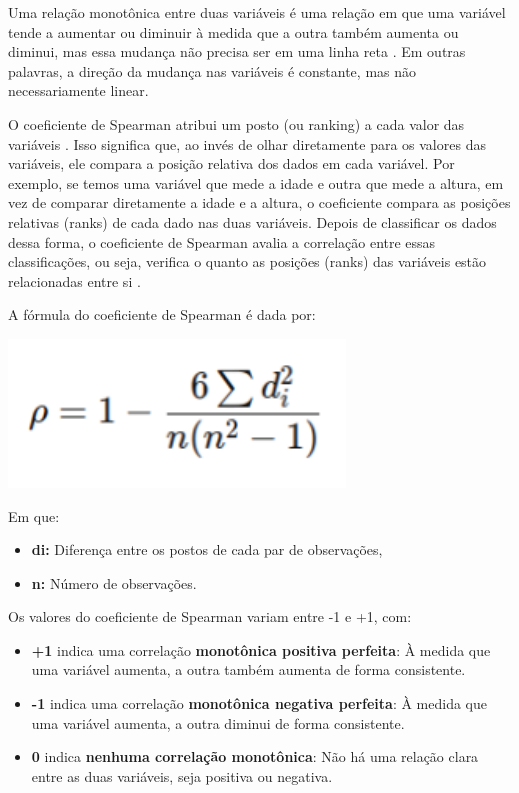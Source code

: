 \begin{apendicesenv}
Uma relação monotônica entre duas variáveis é uma relação em que uma variável tende a aumentar ou diminuir à medida que a outra também aumenta ou diminui, mas essa mudança não precisa ser em uma linha reta \cite{restrepo2007}. Em outras palavras, a direção da mudança nas variáveis é constante, mas não necessariamente linear.

O coeficiente de Spearman atribui um posto (ou ranking) a cada valor das variáveis \cite{sousa2019}. Isso significa que, ao invés de olhar diretamente para os valores das variáveis, ele compara a posição relativa dos dados em cada variável. Por exemplo, se temos uma variável que mede a idade e outra que mede a altura, em vez de comparar diretamente a idade e a altura, o coeficiente compara as posições relativas (ranks) de cada dado nas duas variáveis. Depois de classificar os dados dessa forma, o coeficiente de Spearman avalia a correlação entre essas classificações, ou seja, verifica o quanto as posições (ranks) das variáveis estão relacionadas entre si \cite{sousa2019}.

A fórmula do coeficiente de Spearman é dada por:

\begin{center}
  \includegraphics[scale=0.8]{figuras/CoeficientedeSpearman.pdf}
\end{center}


Em que:
\begin{itemize}
  \item \textbf{di:} Diferença entre os postos de cada par de observações,
  \item \textbf{n:} Número de observações.
\end{itemize}

Os valores do coeficiente de Spearman variam entre -1 e +1, com: 
\begin{itemize}
  \item \textbf{+1} indica uma correlação \textbf{monotônica positiva perfeita}: À medida que uma variável aumenta, a outra também aumenta de forma consistente.
  \item \textbf{-1} indica uma correlação \textbf{monotônica negativa perfeita}: À medida que uma variável aumenta, a outra diminui de forma consistente.
  \item \textbf{0} indica \textbf{nenhuma correlação monotônica}: Não há uma relação clara entre as duas variáveis, seja positiva ou negativa.
\end{itemize}


\end{apendicesenv}
